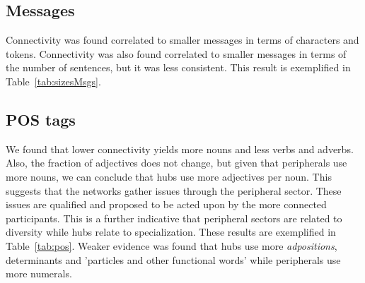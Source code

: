 \subsection{Messages}\label{subsec:mm}

Connectivity was found correlated to smaller messages in terms of characters and tokens.
Connectivity was also found correlated to smaller messages in terms of the number of sentences, but
it was less consistent.
This result is exemplified in Table~\ref{tab:sizesMsgs}.



\subsection{POS tags}\label{subsec:pos}

We found that lower connectivity yields more nouns and less verbs and adverbs.
Also, the fraction of adjectives does not change,
but given that peripherals use more nouns,
we can conclude that hubs use more adjectives per noun.
This suggests that the networks gather issues
through the peripheral sector. 
These issues are qualified and proposed to be acted upon
by the more connected participants.
This is a further indicative that peripheral sectors
are related to diversity while hubs relate to specialization.
These results are exemplified in Table~\ref{tab:pos}.
Weaker evidence was found that hubs use more \emph{adpositions},
determinants and 'particles and other functional words' while
peripherals use more numerals.


